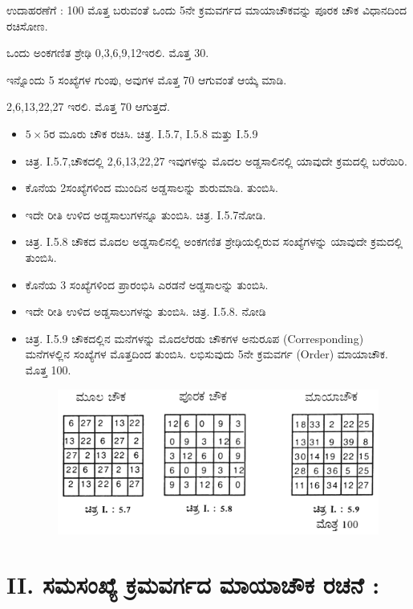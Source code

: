 ಉದಾಹರಣೆಗೆ : 100 ಮೊತ್ತ ಬರುವಂತೆ ಒಂದು 5ನೇ ಕ್ರಮವರ್ಗದ ಮಾಯಾಚೌಕವನ್ನು ಪೂರಕ ಚೌಕ ವಿಧಾನದಿಂದ ರಚಿಸೋಣ.

ಒಂದು ಅಂಕಗಣಿತ ಶ್ರೇಢಿ 0,3,6,9,12ಇರಲಿ. ಮೊತ್ತ 30.

ಇನ್ನೊಂದು 5 ಸಂಖ್ಯೆಗಳ ಗುಂಪು, ಅವುಗಳ ಮೊತ್ತ 70 ಆಗುವಂತೆ ಆಯ್ಕೆ ಮಾಡಿ.

2,6,13,22,27 ಇರಲಿ. ಮೊತ್ತ 70 ಆಗುತ್ತದೆ.

\begin{itemize}
	\item $5 \times 5$ರ ಮೂರು ಚೌಕ ರಚಿಸಿ. ಚಿತ್ರ. I.5.7, I.5.8 ಮತ್ತು I.5.9
	\item ಚಿತ್ರ. I.5.7,ಚೌಕದಲ್ಲಿ 2,6,13,22,27 ಇವುಗಳನ್ನು ಮೊದಲ ಅಡ್ಡಸಾಲಿನಲ್ಲಿ ಯಾವುದೇ ಕ್ರಮದಲ್ಲಿ ಬರೆಯಿರಿ.
	\item ಕೊನೆಯ 2ಸಂಖ್ಯೆಗಳಿಂದ ಮುಂದಿನ ಅಡ್ಡಸಾಲನ್ನು ಶುರುಮಾಡಿ. ತುಂಬಿಸಿ.
	\item ಇದೇ ರೀತಿ ಉಳಿದ ಅಡ್ಡಸಾಲುಗಳನ್ನೂ ತುಂಬಿಸಿ. ಚಿತ್ರ. I.5.7ನೋಡಿ.
	\item ಚಿತ್ರ. I.5.8 ಚೌಕದ ಮೊದಲ ಅಡ್ಡಸಾಲಿನಲ್ಲಿ ಅಂಕಗಣಿತ ಶ್ರೇಢಿಯಲ್ಲಿರುವ ಸಂಖ್ಯೆಗಳನ್ನು ಯಾವುದೇ ಕ್ರಮದಲ್ಲಿ ತುಂಬಿಸಿ.
	\item ಕೊನೆಯ 3 ಸಂಖ್ಯೆಗಳಿಂದ ಪ್ರಾರಂಭಿಸಿ ಎರಡನೆ ಅಡ್ಡಸಾಲನ್ನು ತುಂಬಿಸಿ.
	\item ಇದೇ ರೀತಿ ಉಳಿದ ಅಡ್ಡಸಾಲುಗಳನ್ನು ತುಂಬಿಸಿ. ಚಿತ್ರ. I.5.8. ನೋಡಿ
	\item ಚಿತ್ರ. I.5.9 ಚೌಕದಲ್ಲಿನ ಮನೆಗಳನ್ನು ಮೊದಲೆರಡು ಚೌಕಗಳ ಅನುರೂಪ (Corresponding) ಮನೆಗಳಲ್ಲಿನ ಸಂಖ್ಯೆಗಳ ಮೊತ್ತದಿಂದ ತುಂಬಿಸಿ. ಲಭಿಸುವುದು 5ನೇ ಕ್ರಮವರ್ಗ (Order) ಮಾಯಾಚೌಕ. ಮೊತ್ತ 100.

	\begin{figure}[h]
	\includegraphics{src/figures/chap3/fig3.13.jpg}
	\end{figure}
\end{itemize}

\section{II. ಸಮಸಂಖ್ಯೆ ಕ್ರಮವರ್ಗದ ಮಾಯಾಚೌಕ ರಚನೆ :}

